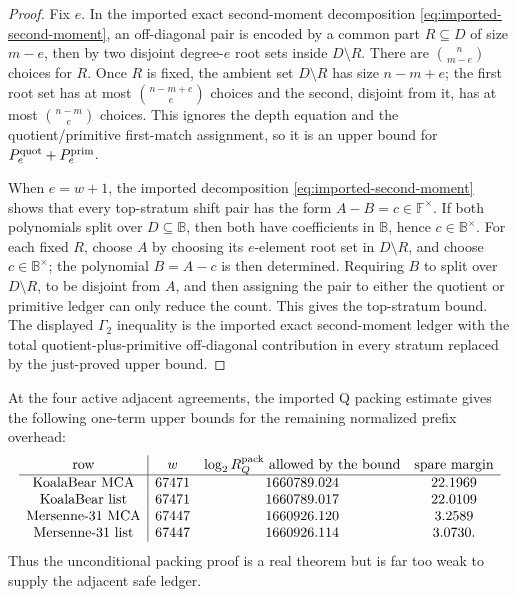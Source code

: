 \documentclass[11pt,a4paper]{amsart}
\numberwithin{equation}{section}
\theoremstyle{remark}
\newcommand{\F}{\mathbb F}\newcommand{\B}{\mathbb B}\newcommand{\K}{\mathbb K}\newcommand{\Z}{\mathbb Z}
\begin{document}
\begin{proof}
Fix \(e\).  In the imported exact second-moment decomposition \eqref{eq:imported-second-moment}, an off-diagonal pair is encoded by a common part \(R\subseteq D\) of size \(m-e\), then by two disjoint degree-\(e\) root sets inside \(D\setminus R\).  There are \(\binom n{m-e}\) choices for \(R\).  Once \(R\) is fixed, the ambient set \(D\setminus R\) has size \(n-m+e\); the first root set has at most \(\binom{n-m+e}{e}\) choices and the second, disjoint from it, has at most \(\binom{n-m}{e}\) choices.  This ignores the depth equation and the quotient/primitive first-match assignment, so it is an upper bound for \(P_e^{\rm quot}+P_e^{\rm prim}\).

When \(e=w+1\), the imported decomposition \eqref{eq:imported-second-moment} shows that every top-stratum shift pair has the form \(A-B=c\in\F^\times\).  If both polynomials split over \(D\subseteq\B\), then both have coefficients in \(\B\), hence \(c\in\B^\times\).  For each fixed \(R\), choose \(A\) by choosing its \(e\)-element root set in \(D\setminus R\), and choose \(c\in\B^\times\); the polynomial \(B=A-c\) is then determined.  Requiring \(B\) to split over \(D\setminus R\), to be disjoint from \(A\), and then assigning the pair to either the quotient or primitive ledger can only reduce the count.  This gives the top-stratum bound.  The displayed \(\Gamma_2\) inequality is the imported exact second-moment ledger with the total quotient-plus-primitive off-diagonal contribution in every stratum replaced by the just-proved upper bound.
\end{proof}


\begin{proposition}\label{prop:proper-q-gap}
At the four active adjacent agreements, the imported Q packing estimate \cite[Secs.~19--21]{CAP25v132} gives the following one-term upper bounds for the remaining normalized prefix overhead:
\[
\begin{array}{c|ccc}
\text{row} & w & \log_2 R_Q^{\rm pack}\text{ allowed by the bound} & \text{spare margin}\\
\hline
\text{KoalaBear MCA} & 67471 & 1660789.024 & 22.1969\\
\text{KoalaBear list} & 67471 & 1660789.017 & 22.0109\\
\text{Mersenne-31 MCA} & 67447 & 1660926.120 & 3.2589\\
\text{Mersenne-31 list} & 67447 & 1660926.114 & 3.0730 .
\end{array}
\]
Thus the unconditional packing proof is a real theorem but is far too weak to supply the adjacent safe ledger.
\end{proposition}
\end{document}
